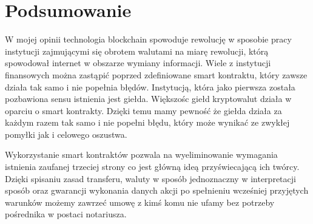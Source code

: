 \documentclass[]{llncs}
\renewcommand{\cite}[1]{~\oldcite{#1}}
\begin{document}


\section{Podsumowanie}

  W mojej opinii technologia blockchain spowoduje rewolucję w sposobie pracy
  instytucji zajmującymi się obrotem walutami na miarę rewolucji, którą
  spowodował internet w obszarze wymiany informacji. Wiele z instytucji
  finansowych można zastąpić poprzed zdefiniowane smart kontraktu, który zawsze
  działa tak samo i nie popełnia błędów. Instytucją, która jako pierwsza została
  pozbawiona sensu istnienia jest giełda. Większośc giełd kryptowalut działa w
  oparciu o smart kontrakty. Dzięki temu mamy pewność że giełda działa za każdym
  razem tak samo i nie popełni błędu, który może wynikać ze zwykłej pomyłki jak
  i celowego oszustwa.

  Wykorzystanie smart kontraktów pozwala na wyeliminowanie wymagania istnienia
  zaufanej trzeciej strony co jest główną ideą przyświecającą ich twórcy. Dzięki
  spisaniu zasad transferu, waluty w sposób jednoznaczny w interpretacji sposób
  oraz gwarancji wykonania danych akcji po spełnieniu wcześniej przyjętych
  warunków możemy zawrzeć umowę z kimś komu nie ufamy bez potrzeby pośrednika w
  postaci notariusza.

\printbibliography
\end{document}
